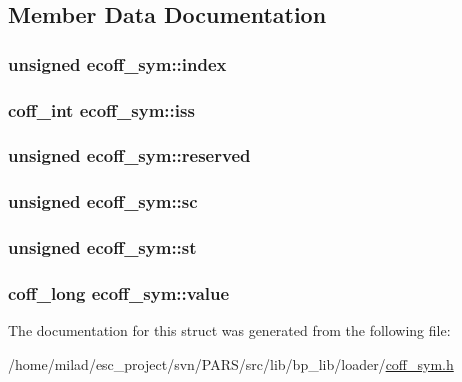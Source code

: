 \subsection{Member Data Documentation}
\hypertarget{structecoff__sym_aec47fca2d8f69799980da61d442414f0}{
\subsubsection[{index}]{\setlength{\rightskip}{0pt plus 5cm}unsigned {\bf ecoff\_\-sym::index}}}
\label{structecoff__sym_aec47fca2d8f69799980da61d442414f0}
\hypertarget{structecoff__sym_a84e2f0ffef18d414f63742dc0f7c34bf}{
\subsubsection[{iss}]{\setlength{\rightskip}{0pt plus 5cm}coff\_\-int {\bf ecoff\_\-sym::iss}}}
\label{structecoff__sym_a84e2f0ffef18d414f63742dc0f7c34bf}
\hypertarget{structecoff__sym_a1e46d0ed7bc76ecc0faf584d88d0ab74}{
\subsubsection[{reserved}]{\setlength{\rightskip}{0pt plus 5cm}unsigned {\bf ecoff\_\-sym::reserved}}}
\label{structecoff__sym_a1e46d0ed7bc76ecc0faf584d88d0ab74}
\hypertarget{structecoff__sym_ac665cb20549d0a79d2c7bd5e0d659e41}{
\subsubsection[{sc}]{\setlength{\rightskip}{0pt plus 5cm}unsigned {\bf ecoff\_\-sym::sc}}}
\label{structecoff__sym_ac665cb20549d0a79d2c7bd5e0d659e41}
\hypertarget{structecoff__sym_a0ff7a57359cca8c3b5cb1ce1562c8fb5}{
\subsubsection[{st}]{\setlength{\rightskip}{0pt plus 5cm}unsigned {\bf ecoff\_\-sym::st}}}
\label{structecoff__sym_a0ff7a57359cca8c3b5cb1ce1562c8fb5}
\hypertarget{structecoff__sym_a29ad6f5c1882fa45e38611590fc39b86}{
\subsubsection[{value}]{\setlength{\rightskip}{0pt plus 5cm}coff\_\-long {\bf ecoff\_\-sym::value}}}
\label{structecoff__sym_a29ad6f5c1882fa45e38611590fc39b86}


The documentation for this struct was generated from the following file:\begin{DoxyCompactItemize}
\item 
/home/milad/esc\_\-project/svn/PARS/src/lib/bp\_\-lib/loader/\hyperlink{coff__sym_8h}{coff\_\-sym.h}\end{DoxyCompactItemize}
